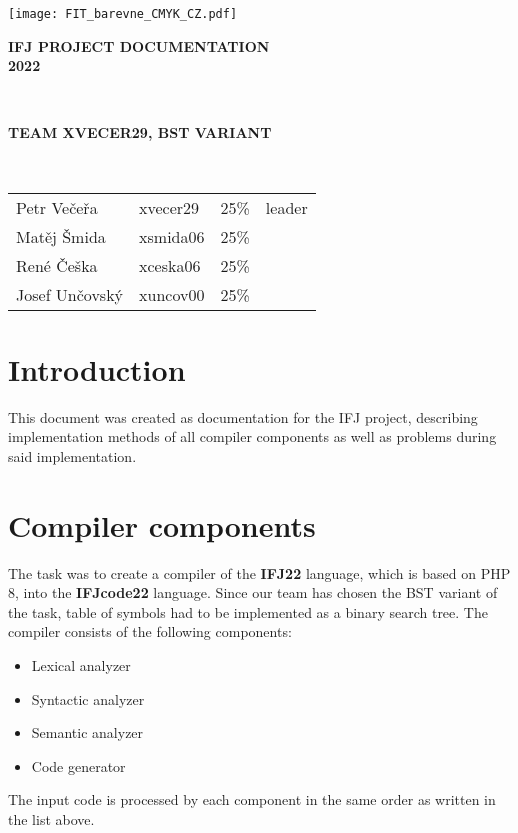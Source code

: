 \documentclass{article}
\begin{document}
\begin{titlepage}
\begin{center}
    \texttt{[image: FIT\_barevne\_CMYK\_CZ.pdf]} \\
    \begin{LARGE}
    	\textsc{\textbf{IFJ PROJECT DOCUMENTATION}}
    	\\[10mm]
    	\textsc{\textbf{2022}}
    \end{LARGE}
    \\[50mm]
    \begin{LARGE}
        \textsc{\textbf{TEAM XVECER29, BST VARIANT}}
    \end{LARGE}
    \\[25mm]
\begin{table}[h]
\centering
\begin{large}
    \begin{tabular}{l l l l}
         Petr Večeřa & xvecer29 & 25\% & leader\\[2mm]
         Matěj Šmida & xsmida06 & 25\% &\\[2mm]
         René Češka & xceska06 & 25\% &\\[2mm]
         Josef Unčovský & xuncov00 & 25\% &
    \end{tabular}
\end{large}
\end{table}
\end{center}
\end{titlepage}
\tableofcontents
\newpage
\section{Introduction}
This document was created as documentation for the IFJ project, describing implementation methods of all compiler components as well as problems during said implementation.
\section{Compiler components}
The task was to create a compiler of the \textbf{IFJ22} language, which is based on PHP 8, into the \textbf{IFJcode22} language. Since our team has chosen the BST variant of the task, table of symbols had to be implemented as a binary search tree.
The compiler consists of the following components:
\begin{itemize}
    \item Lexical analyzer
    \item Syntactic analyzer
    \item Semantic analyzer
    \item Code generator
\end{itemize}
The input code is processed by each component in the same order as written in the list above.
\end{document}
